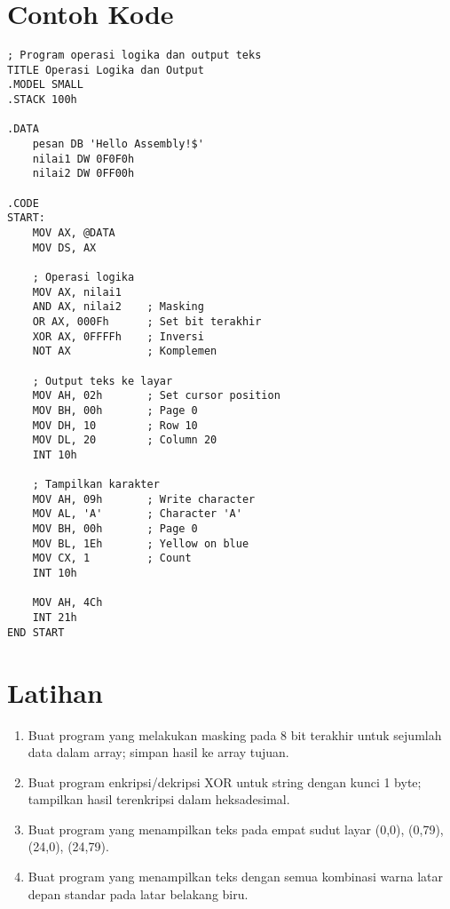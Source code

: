 \section{Contoh Kode}
\begin{verbatim}
; Program operasi logika dan output teks
TITLE Operasi Logika dan Output
.MODEL SMALL
.STACK 100h

.DATA
    pesan DB 'Hello Assembly!$'
    nilai1 DW 0F0F0h
    nilai2 DW 0FF00h

.CODE
START:
    MOV AX, @DATA
    MOV DS, AX
    
    ; Operasi logika
    MOV AX, nilai1
    AND AX, nilai2    ; Masking
    OR AX, 000Fh      ; Set bit terakhir
    XOR AX, 0FFFFh    ; Inversi
    NOT AX            ; Komplemen
    
    ; Output teks ke layar
    MOV AH, 02h       ; Set cursor position
    MOV BH, 00h       ; Page 0
    MOV DH, 10        ; Row 10
    MOV DL, 20        ; Column 20
    INT 10h
    
    ; Tampilkan karakter
    MOV AH, 09h       ; Write character
    MOV AL, 'A'       ; Character 'A'
    MOV BH, 00h       ; Page 0
    MOV BL, 1Eh       ; Yellow on blue
    MOV CX, 1         ; Count
    INT 10h
    
    MOV AH, 4Ch
    INT 21h
END START
\end{verbatim}

\section{Latihan}
\begin{enumerate}
  \item Buat program yang melakukan masking pada 8 bit terakhir untuk sejumlah data dalam array; simpan hasil ke array tujuan.
  \item Buat program enkripsi/dekripsi XOR untuk string dengan kunci 1 byte; tampilkan hasil terenkripsi dalam heksadesimal.
  \item Buat program yang menampilkan teks pada empat sudut layar (0,0), (0,79), (24,0), (24,79).
  \item Buat program yang menampilkan teks dengan semua kombinasi warna latar depan standar pada latar belakang biru.
\end{enumerate}

